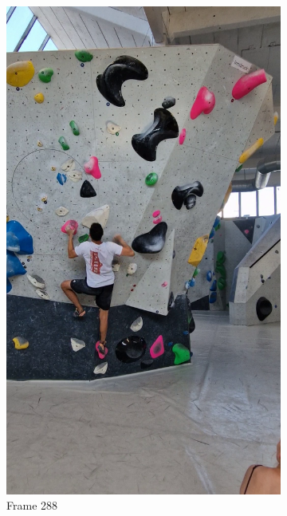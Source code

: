 \documentclass[./main.tex]{subfiles}
\begin{document}
\begin{figure}[htbp]
\begin{subfigure}{0.3\textwidth}
        \includegraphics[width=\textwidth]{entities/CA_288.png}
        \caption{Frame 288}
    \end{subfigure}
    \begin{subfigure}{0.3\textwidth}
        \centering

\end{subfigure}
\end{figure}
\end{document}
